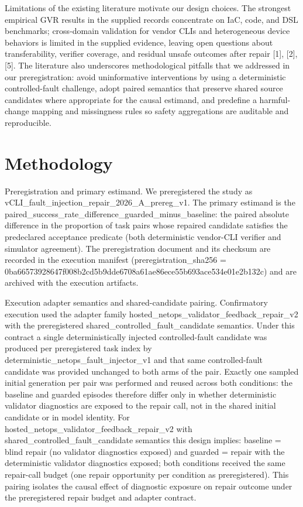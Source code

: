 \documentclass[conference]{IEEEtran}
\begin{document}
Limitations of the existing literature motivate our design choices. The strongest empirical GVR results in the supplied records concentrate on IaC, code, and DSL benchmarks; cross-domain validation for vendor CLIs and heterogeneous device behaviors is limited in the supplied evidence, leaving open questions about transferability, verifier coverage, and residual unsafe outcomes after repair [1], [2], [5]. The literature also underscores methodological pitfalls that we addressed in our preregistration: avoid uninformative interventions by using a deterministic controlled-fault challenge, adopt paired semantics that preserve shared source candidates where appropriate for the causal estimand, and predefine a harmful-change mapping and missingness rules so safety aggregations are auditable and reproducible.

\section{Methodology}
Preregistration and primary estimand. We preregistered the study as vCLI\_fault\_injection\_repair\_2026\_A\_prereg\_v1. The primary estimand is the paired\_success\_rate\_difference\_guarded\_minus\_baseline: the paired absolute difference in the proportion of task pairs whose repaired candidate satisfies the predeclared acceptance predicate (both deterministic vendor-CLI verifier and simulator agreement). The preregistration document and its checksum are recorded in the execution manifest (preregistration\_sha256 = 0ba66573\allowbreak{}928647f0\allowbreak{}08b2cd5b\allowbreak{}9dde6708\allowbreak{}a61ae86e\allowbreak{}ce55b693\allowbreak{}ace534e0\allowbreak{}1e2b132c) and are archived with the execution artifacts.

Execution adapter semantics and shared-candidate pairing. Confirmatory execution used the adapter family hosted\_netops\_validator\_feedback\_repair\_v2 with the preregistered shared\_controlled\_fault\_candidate semantics. Under this contract a single deterministically injected controlled-fault candidate was produced per preregistered task index by deterministic\_netops\_fault\_injector\_v1 and that same controlled-fault candidate was provided unchanged to both arms of the pair. Exactly one sampled initial generation per pair was performed and reused across both conditions: the baseline and guarded episodes therefore differ only in whether deterministic validator diagnostics are exposed to the repair call, not in the shared initial candidate or in model identity. For hosted\_netops\_validator\_feedback\_repair\_v2 with shared\_controlled\_fault\_candidate semantics this design implies: baseline = blind repair (no validator diagnostics exposed) and guarded = repair with the deterministic validator diagnostics exposed; both conditions received the same repair-call budget (one repair opportunity per condition as preregistered). This pairing isolates the causal effect of diagnostic exposure on repair outcome under the preregistered repair budget and adapter contract.
\end{document}
